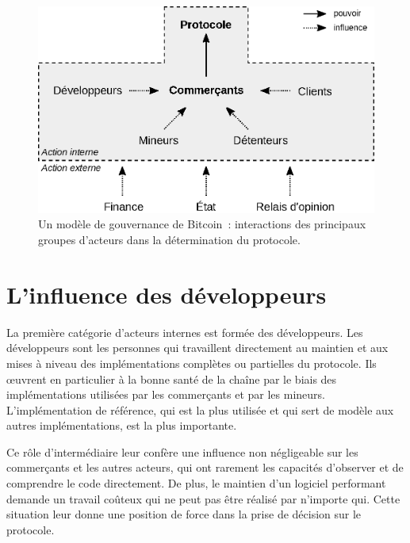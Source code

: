 \begin{figure}[h]
  \centering
  \includegraphics[scale=0.75]{img/bitcoin-governance-model.eps}
  \caption{Un modèle de gouvernance de Bitcoin~: interactions des principaux groupes d'acteurs dans la détermination du protocole.}
\end{figure}

\section*{L'influence des développeurs}

La première catégorie d'acteurs internes est formée des développeurs. Les développeurs sont les personnes qui travaillent directement au maintien et aux mises à niveau des implémentations complètes ou partielles du protocole. Ils œuvrent en particulier à la bonne santé de la chaîne par le biais des implémentations utilisées par les commerçants et par les mineurs. L'implémentation de référence, qui est la plus utilisée et qui sert de modèle aux autres implémentations, est la plus importante.

Ce rôle d'intermédiaire leur confère une influence non négligeable sur les commerçants et les autres acteurs, qui ont rarement les capacités d'observer et de comprendre le code directement. De plus, le maintien d'un logiciel performant demande un travail coûteux qui ne peut pas être réalisé par n'importe qui. Cette situation leur donne une position de force dans la prise de décision sur le protocole.

